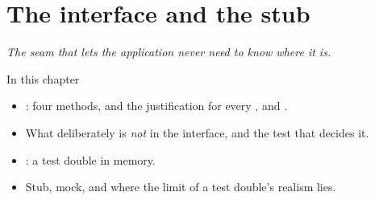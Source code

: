 \chapter{The interface and the stub}
\label{ch:interface}


{\large\itshape The seam that lets the application never need to know where it is.\par}

\begin{chapterbox}{In this chapter}
\begin{itemize}
  \item {}: four methods, and the justification for every
    ,  and \code{[[nodiscard]]}.
  \item What deliberately is \emph{not} in the interface, and the test that decides it.
  \item {}: a test double in memory.
  \item Stub, mock, and where the limit of a test double's realism lies.
\end{itemize}
\end{chapterbox}




